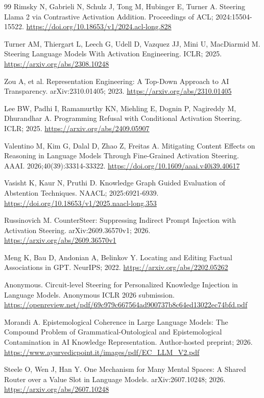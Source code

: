 \documentclass[preprint,12pt,numbers,nopreprintline]{elsarticle}
\begin{document}
\begin{thebibliography}{99}
Rimsky N, Gabrieli N, Schulz J, Tong M, Hubinger E, Turner A. Steering Llama 2 via Contrastive Activation Addition. Proceedings of ACL; 2024:15504-15522. \url{https://doi.org/10.18653/v1/2024.acl-long.828}

Turner AM, Thiergart L, Leech G, Udell D, Vazquez JJ, Mini U, MacDiarmid M. Steering Language Models With Activation Engineering. ICLR; 2025. \url{https://arxiv.org/abs/2308.10248}

Zou A, et al. Representation Engineering: A Top-Down Approach to AI Transparency. arXiv:2310.01405; 2023. \url{https://arxiv.org/abs/2310.01405}

Lee BW, Padhi I, Ramamurthy KN, Miehling E, Dognin P, Nagireddy M, Dhurandhar A. Programming Refusal with Conditional Activation Steering. ICLR; 2025. \url{https://arxiv.org/abs/2409.05907}

Valentino M, Kim G, Dalal D, Zhao Z, Freitas A. Mitigating Content Effects on Reasoning in Language Models Through Fine-Grained Activation Steering. AAAI. 2026;40(39):33314-33322. \url{https://doi.org/10.1609/aaai.v40i39.40617}

Vasisht K, Kaur N, Pruthi D. Knowledge Graph Guided Evaluation of Abstention Techniques. NAACL; 2025:6921-6939. \url{https://doi.org/10.18653/v1/2025.naacl-long.353}

Russinovich M. CounterSteer: Suppressing Indirect Prompt Injection with Activation Steering. arXiv:2609.36570v1; 2026. \url{https://arxiv.org/abs/2609.36570v1}

Meng K, Bau D, Andonian A, Belinkov Y. Locating and Editing Factual Associations in GPT. NeurIPS; 2022. \url{https://arxiv.org/abs/2202.05262}

Anonymous. Circuit-level Steering for Personalized Knowledge Injection in Language Models. Anonymous ICLR 2026 submission. \url{https://openreview.net/pdf/69c979c667564ad900737b8c64ed13022ec74bfd.pdf}

Morandi A. Epistemological Coherence in Large Language Models: The Compound Problem of Grammatical-Ontological and Epistemological Contamination in AI Knowledge Representation. Author-hosted preprint; 2026. \url{https://www.ayurvedicpoint.it/images/pdf/EC_LLM_V2.pdf}

Steele O, Wen J, Han Y. One Mechanism for Many Mental Spaces: A Shared Router over a Value Slot in Language Models. arXiv:2607.10248; 2026. \url{https://arxiv.org/abs/2607.10248}


\end{thebibliography}
\end{document}
